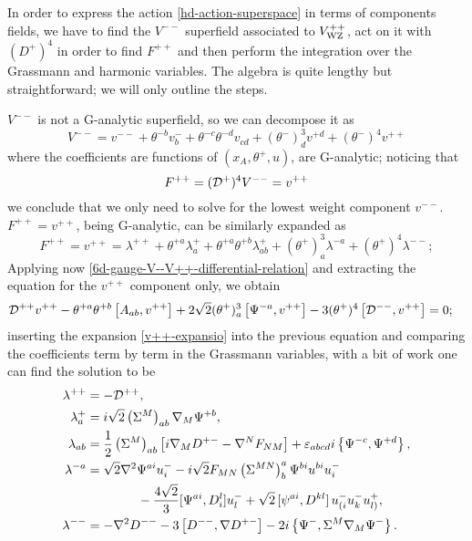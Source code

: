 In order to express the action \eqref{hd-action-superspace} in terms of components fields, we have to find the $V^{--}$ superfield associated to $V^{++}_{ \text{WZ} }$, act on it with $(D^+)^4$ in order to find $F^{++}$ and then perform the integration over the Grassmann and harmonic variables. The algebra is quite lengthy but straightforward; we will only outline the steps.

$V^{--}$ is not a G-analytic superfield, so we can decompose it as
\begin{equation}
V^{--} 
	=
v^{--}
+ \theta^{- b} v_{ b }^-
+ \theta^{-c} \theta^{-d} v_{cd}
+ (\theta^-)^3_d v^{+d}
+ (\theta^-)^4 v^{++}
\end{equation}
where the coefficients are functions of \((x_A, \theta^+, u)\), \ie are G-analytic;
noticing that
\begin{equation}
F^{++} =  ({ \mathcal{D} }^+)^4 V^{--} = v^{++} 	
\end{equation}
we conclude that we only need to solve for  the lowest  weight component $v^{--}$. 
$F^{++} = v^{++}$, being  G-analytic, can be similarly expanded as
\begin{equation}\label{v++-expansio}
F^{++}
= v^{++} =
\lambda^{++}
+ \theta^{+a} \lambda^+_a
+ \theta^{+a} \theta^{+b} \lambda^+_{ab}
+ (\theta^{+})^3_a \lambda^{-a}
+ (\theta^{+})^4 \lambda^{--};
\end{equation}
 Applying now \eqref{6d-gauge-V--V++-differential-relation} and extracting the equation for the $v^{++}$ component only, we obtain
\begin{equation}
\begin{split}
{ \mathcal{D} }^{++} v^{++}
&- \theta^{+a} \theta^{+b} \left[  A_{ab}  , v^{++}  \right]
+ 2 \sqrt{2} (\theta^+)^3_a \left[  \Psi^{-a}  , v^{++}  \right]
- 3 (\theta^+)^4 \left[  { \mathcal{D} }^{--} ,  v^{++} \right]
	=
0;
\end{split}
\end{equation}
inserting the expansion \eqref{v++-expansio} into the previous equation and comparing the coefficients term by term in the Grassmann variables, with a bit of work one can find the solution to be
\begin{align}
	\lambda^{++}
& = 
	- { \mathcal{D} }^{++}
,\\
	\lambda^{+}_a
& = 
	i \sqrt{2} \left( \Sigma^M \right)_{ab} { \mathcal{\nabla} }_M \Psi^{+b}
,\\
	\lambda_{ab}
& = 
	\frac{1}{2} \left( \Sigma^M \right)_{ab}
		\left[ i { \mathcal{\nabla} }_M D^{+-} - { \mathcal{\nabla} }^N F_{NM} \right]
	+ \varepsilon_{abcd} i \left\{ \Psi^{-c},\Psi^{+d}\right\}
,\\
	\lambda^{-a}
& = 
	\sqrt{2} { \mathcal{\nabla} }^2 \Psi^{ai} u^-_i 
	- i \sqrt{2} F_{MN} \left( \Sigma^{MN} \right)^a_b \Psi^{bi} u^{ bi } u^-_i
	\\ & \qquad \qquad - \frac{4\sqrt{2}}{3} [\Psi^{ai}, D^l_i] u^-_l
	+ \sqrt{2} \, [\psi^{ai}, D^{kl}]\, u^-_{(i}u^-_ku^+_{l)}
,\\
	\lambda^{--}
& = 
	- { \mathcal{\nabla} }^2 D^{--} - 3 \left[  D^{--} , { \mathcal{\nabla} } D^{+-} \right]
	- 2i \left\{  \Psi^-, \Sigma^M { \mathcal{\nabla} }_M \Psi^- \right\}
.
\end{align}






